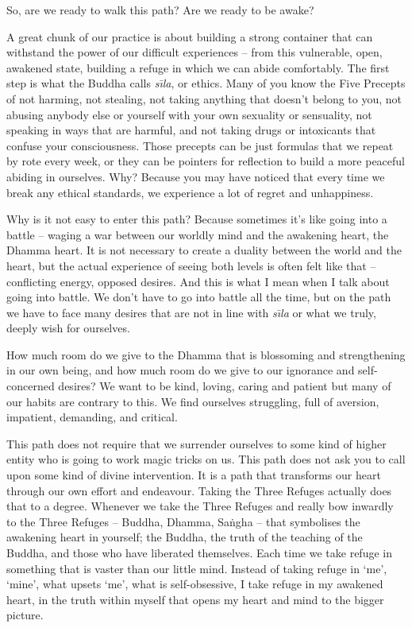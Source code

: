 So, are we ready to walk this path? Are we ready to be awake? 

A great chunk of our practice is about building a strong container that can withstand the power of our difficult experiences -- from this vulnerable, open, awakened state, building a refuge in which we can abide comfortably. The first step is what the Buddha calls \textit{s\={\i}la}, or ethics. Many of you know the Five Precepts of not harming, not stealing, not taking anything that doesn't belong to you, not abusing anybody else or yourself with your own sexuality or sensuality, not speaking in ways that are harmful, and not taking drugs or intoxicants that confuse your consciousness. Those precepts can be just formulas that we repeat by rote every week, or they can be pointers for reflection to build a more peaceful abiding in ourselves. Why? Because you may have noticed that every time we break any ethical standards, we experience a lot of regret and unhappiness. 

Why is it not easy to enter this path? Because sometimes it's like going into a battle -- waging a war between our worldly mind and the awakening heart, the Dhamma heart. It is not necessary to create a duality between the world and the heart, but the actual experience of seeing both levels is often felt like that -- conflicting energy, opposed desires. And this is what I mean when I talk about going into battle. We don't have to go into battle all the time, but on the path we have to face many desires that are not in line with \textit{s\={\i}la} or what we truly, deeply wish for ourselves.

How much room do we give to the Dhamma that is blossoming and strengthening in our own being, and how much room do we give to our ignorance and self-concerned desires? We want to be kind, loving, caring and patient but many of our habits are contrary to this. We find ourselves struggling, full of aversion, impatient, demanding, and critical. 

This path does not require that we surrender ourselves to some kind of higher entity who is going to work magic tricks on us. This path does not ask you to call upon some kind of divine intervention. It is a path that transforms our heart through our own effort and endeavour. Taking the Three Refuges actually does that to a degree. Whenever we take the Three Refuges and really bow inwardly to the Three Refuges -- Buddha, Dhamma, Sa\.ngha -- that symbolises the awakening heart in yourself; the Buddha, the truth of the teaching of the Buddha, and those who have liberated themselves. Each time we take refuge in something that is vaster than our little mind. Instead of taking refuge in `me', `mine', what upsets `me', what is self-obsessive, I take refuge in my awakened heart, in the truth within myself that opens my heart and mind to the bigger picture.

